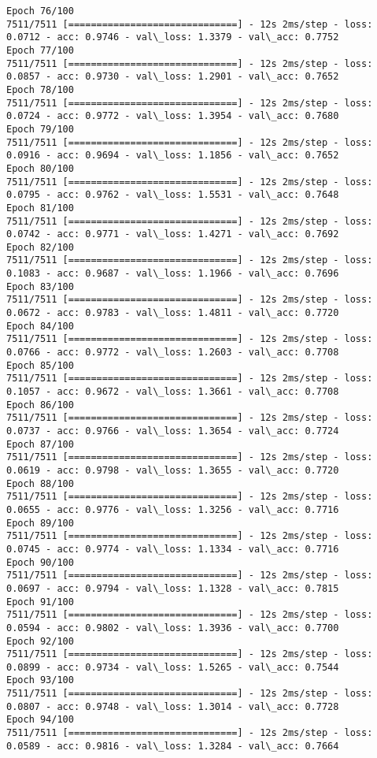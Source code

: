 \documentclass[11pt]{article}
\begin{document}
\begin{Verbatim}[commandchars=\\\{\}]
Epoch 76/100
7511/7511 [==============================] - 12s 2ms/step - loss: 0.0712 - acc: 0.9746 - val\_loss: 1.3379 - val\_acc: 0.7752
Epoch 77/100
7511/7511 [==============================] - 12s 2ms/step - loss: 0.0857 - acc: 0.9730 - val\_loss: 1.2901 - val\_acc: 0.7652
Epoch 78/100
7511/7511 [==============================] - 12s 2ms/step - loss: 0.0724 - acc: 0.9772 - val\_loss: 1.3954 - val\_acc: 0.7680
Epoch 79/100
7511/7511 [==============================] - 12s 2ms/step - loss: 0.0916 - acc: 0.9694 - val\_loss: 1.1856 - val\_acc: 0.7652
Epoch 80/100
7511/7511 [==============================] - 12s 2ms/step - loss: 0.0795 - acc: 0.9762 - val\_loss: 1.5531 - val\_acc: 0.7648
Epoch 81/100
7511/7511 [==============================] - 12s 2ms/step - loss: 0.0742 - acc: 0.9771 - val\_loss: 1.4271 - val\_acc: 0.7692
Epoch 82/100
7511/7511 [==============================] - 12s 2ms/step - loss: 0.1083 - acc: 0.9687 - val\_loss: 1.1966 - val\_acc: 0.7696
Epoch 83/100
7511/7511 [==============================] - 12s 2ms/step - loss: 0.0672 - acc: 0.9783 - val\_loss: 1.4811 - val\_acc: 0.7720
Epoch 84/100
7511/7511 [==============================] - 12s 2ms/step - loss: 0.0766 - acc: 0.9772 - val\_loss: 1.2603 - val\_acc: 0.7708
Epoch 85/100
7511/7511 [==============================] - 12s 2ms/step - loss: 0.1057 - acc: 0.9672 - val\_loss: 1.3661 - val\_acc: 0.7708
Epoch 86/100
7511/7511 [==============================] - 12s 2ms/step - loss: 0.0737 - acc: 0.9766 - val\_loss: 1.3654 - val\_acc: 0.7724
Epoch 87/100
7511/7511 [==============================] - 12s 2ms/step - loss: 0.0619 - acc: 0.9798 - val\_loss: 1.3655 - val\_acc: 0.7720
Epoch 88/100
7511/7511 [==============================] - 12s 2ms/step - loss: 0.0655 - acc: 0.9776 - val\_loss: 1.3256 - val\_acc: 0.7716
Epoch 89/100
7511/7511 [==============================] - 12s 2ms/step - loss: 0.0745 - acc: 0.9774 - val\_loss: 1.1334 - val\_acc: 0.7716
Epoch 90/100
7511/7511 [==============================] - 12s 2ms/step - loss: 0.0697 - acc: 0.9794 - val\_loss: 1.1328 - val\_acc: 0.7815
Epoch 91/100
7511/7511 [==============================] - 12s 2ms/step - loss: 0.0594 - acc: 0.9802 - val\_loss: 1.3936 - val\_acc: 0.7700
Epoch 92/100
7511/7511 [==============================] - 12s 2ms/step - loss: 0.0899 - acc: 0.9734 - val\_loss: 1.5265 - val\_acc: 0.7544
Epoch 93/100
7511/7511 [==============================] - 12s 2ms/step - loss: 0.0807 - acc: 0.9748 - val\_loss: 1.3014 - val\_acc: 0.7728
Epoch 94/100
7511/7511 [==============================] - 12s 2ms/step - loss: 0.0589 - acc: 0.9816 - val\_loss: 1.3284 - val\_acc: 0.7664

\end{Verbatim}
\end{document}
